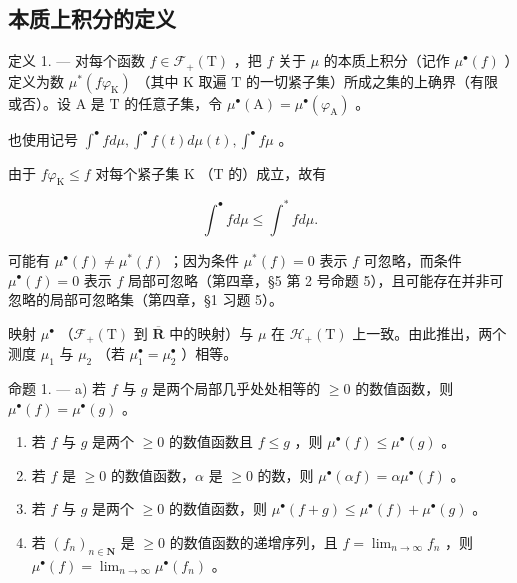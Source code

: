 \subsection{本质上积分的定义}

定义 1. --- 对每个函数 \(f \in \mathcal{F}_{+}(\mathrm{T})\) ，把 \(f\) 关于 \(\mu\) 的本质上积分（记作 \(\mu^{\bullet}(f)\) ）定义为数 \(\mu^{*}(f\varphi_{\mathrm{K}})\) （其中 \(\mathrm{K}\) 取遍 \(\mathrm{T}\) 的一切紧子集）所成之集的上确界（有限或否）。设 \(\mathrm{A}\) 是 \(\mathrm{T}\) 的任意子集，令 \(\mu^{\bullet}(\mathrm{A}) = \mu^{\bullet}(\varphi_{\mathrm{A}})\) 。

也使用记号 \(\int^{\bullet}f d\mu ,\int^{\bullet}f(t)d\mu (t),\int^{\bullet}f\mu\) 。

由于 \(f\varphi_{\mathrm{K}} \leqslant f\) 对每个紧子集 \(\mathrm{K}\) （\(\mathrm{T}\) 的）成立，故有

\[
\int^ {\bullet} f d \mu \leqslant \int^ {*} f d \mu .\tag{1}
\]

可能有 \(\mu^{\bullet}(f) \neq \mu^{*}(f)\) ；因为条件 \(\mu^{*}(f) = 0\) 表示 \(f\) 可忽略，而条件 \(\mu^{\bullet}(f) = 0\) 表示 \(f\) 局部可忽略（第四章，§5 第 2 号命题 5），且可能存在并非可忽略的局部可忽略集（第四章，§1 习题 5）。

映射 \(\mu^{\bullet}\) （\(\mathcal{F}_{+}(\mathrm{T})\) 到 \(\overline{\mathbf{R}}\) 中的映射）与 \(\mu\) 在 \(\mathcal{H}_{+}(\mathrm{T})\) 上一致。由此推出，两个测度 \(\mu_{1}\) 与 \(\mu_{2}\) （若 \(\mu_{1}^{\bullet} = \mu_{2}^{\bullet}\) ）相等。

命题 1. --- a) 若 \(f\) 与 \(g\) 是两个局部几乎处处相等的 \(\geqslant 0\) 的数值函数，则 \(\mu^{\bullet}(f) = \mu^{\bullet}(g)\) 。

\begin{enumerate}
\def\labelenumi{\alph{enumi})}
\setcounter{enumi}{1}
\item
  若 \(f\) 与 \(g\) 是两个 \(\geqslant 0\) 的数值函数且 \(f \leqslant g\) ，则 \(\mu^{\bullet}(f) \leqslant \mu^{\bullet}(g)\) 。
\item
  若 \(f\) 是 \(\geqslant 0\) 的数值函数，\(\alpha\) 是 \(\geqslant 0\) 的数，则 \(\mu^{\bullet}(\alpha f) = \alpha \mu^{\bullet}(f)\) 。
\item
  若 \(f\) 与 \(g\) 是两个 \(\geqslant 0\) 的数值函数，则 \(\mu^{\bullet}(f + g) \leqslant \mu^{\bullet}(f) + \mu^{\bullet}(g)\) 。
\item
  若 \((f_n)_{n\in \mathbf{N}}\) 是 \(\geqslant 0\) 的数值函数的递增序列，且 \(f = \lim_{n\to \infty}f_n\) ，则 \(\mu^{\bullet}(f) = \lim_{n\to \infty}\mu^{\bullet}(f_n)\) 。
\end{enumerate}

